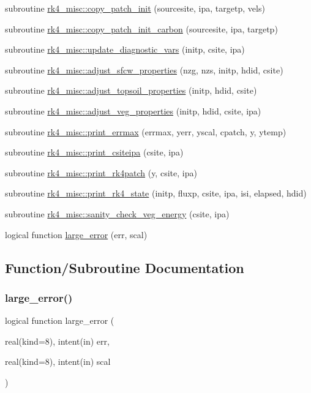 \begin{DoxyCompactItemize}
\item 
subroutine \hyperlink{namespacerk4__misc_aa79df20c0e21c9a3cf1e123e1db02b87}{rk4\+\_\+misc\+::copy\+\_\+patch\+\_\+init} (sourcesite, ipa, targetp, vels)
\item 
subroutine \hyperlink{namespacerk4__misc_a7132387d730d3da751ea77dd93a7afbc}{rk4\+\_\+misc\+::copy\+\_\+patch\+\_\+init\+\_\+carbon} (sourcesite, ipa, targetp)
\item 
subroutine \hyperlink{namespacerk4__misc_a71e0657b3f067044fe73885aff7e3bdb}{rk4\+\_\+misc\+::update\+\_\+diagnostic\+\_\+vars} (initp, csite, ipa)
\item 
subroutine \hyperlink{namespacerk4__misc_a27d8c2dd3d61a329f458c612f1be4a3c}{rk4\+\_\+misc\+::adjust\+\_\+sfcw\+\_\+properties} (nzg, nzs, initp, hdid, csite)
\item 
subroutine \hyperlink{namespacerk4__misc_a297b2fd4e4c3cbbe4594fa8e898ccf6b}{rk4\+\_\+misc\+::adjust\+\_\+topsoil\+\_\+properties} (initp, hdid, csite)
\item 
subroutine \hyperlink{namespacerk4__misc_a8ad63c7f041787382989c9b575a58121}{rk4\+\_\+misc\+::adjust\+\_\+veg\+\_\+properties} (initp, hdid, csite, ipa)
\item 
subroutine \hyperlink{namespacerk4__misc_a4d89dfa4dae6cb5c224c342c4dc56b63}{rk4\+\_\+misc\+::print\+\_\+errmax} (errmax, yerr, yscal, cpatch, y, ytemp)
\item 
subroutine \hyperlink{namespacerk4__misc_a0c4d2f93e98e7f917d90689dcdaf47e3}{rk4\+\_\+misc\+::print\+\_\+csiteipa} (csite, ipa)
\item 
subroutine \hyperlink{namespacerk4__misc_a6f1b7481db8c4187a653058e22652cb9}{rk4\+\_\+misc\+::print\+\_\+rk4patch} (y, csite, ipa)
\item 
subroutine \hyperlink{namespacerk4__misc_a0fe72170ef0eaaa9bde73392734d9a45}{rk4\+\_\+misc\+::print\+\_\+rk4\+\_\+state} (initp, fluxp, csite, ipa, isi, elapsed, hdid)
\item 
subroutine \hyperlink{namespacerk4__misc_a63cf1dd78ecfe4d8e3a076f728b2b275}{rk4\+\_\+misc\+::sanity\+\_\+check\+\_\+veg\+\_\+energy} (csite, ipa)
\item 
logical function \hyperlink{rk4__misc_8f90_a9be8b0e1d2df1a3ab85aae8eee3e737a}{large\+\_\+error} (err, scal)
\end{DoxyCompactItemize}


\subsection{Function/\+Subroutine Documentation}
\mbox{\label{rk4__misc_8f90_a9be8b0e1d2df1a3ab85aae8eee3e737a}} 
\subsubsection{\texorpdfstring{large\+\_\+error()}{large\_error()}}
{\footnotesize\ttfamily logical function large\+\_\+error (\begin{DoxyParamCaption}\item[{real(kind=8), intent(in)}]{err,  }\item[{real(kind=8), intent(in)}]{scal }\end{DoxyParamCaption})}

